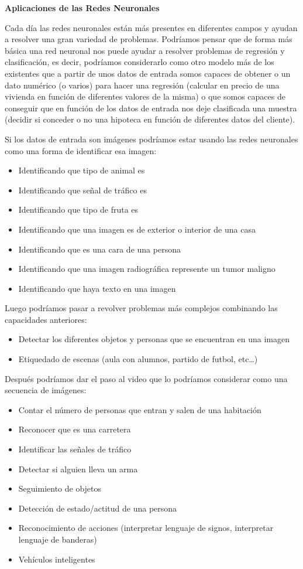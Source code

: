 \documentclass[
  a4paper,
  DIV=11,
  numbers=noendperiod]{scrreprt}
\begin{document}
\textbf{Aplicaciones de las Redes Neuronales}

Cada día las redes neuronales están más presentes en diferentes campos y
ayudan a resolver una gran variedad de problemas. Podríamos pensar que
de forma más básica una red neuronal nos puede ayudar a resolver
problemas de regresión y clasificación, es decir, podríamos considerarlo
como otro modelo más de los existentes que a partir de unos datos de
entrada somos capaces de obtener o un dato numérico (o varios) para
hacer una regresión (calcular en precio de una vivienda en función de
diferentes valores de la misma) o que somos capaces de conseguir que en
función de los datos de entrada nos deje clasificada una muestra
(decidir si conceder o no una hipoteca en función de diferentes datos
del cliente).

Si los datos de entrada son imágenes podríamos estar usando las redes
neuronales como una forma de identificar esa imagen:

\begin{itemize}
\item
  Identificando que tipo de animal es
\item
  Identificando que señal de tráfico es
\item
  Identificando que tipo de fruta es
\item
  Identificando que una imagen es de exterior o interior de una casa
\item
  Identificando que es una cara de una persona
\item
  Identificando que una imagen radiográfica represente un tumor maligno
\item
  Identificando que haya texto en una imagen
\end{itemize}

Luego podríamos pasar a revolver problemas más complejos combinando las
capacidades anteriores:

\begin{itemize}
\item
  Detectar los diferentes objetos y personas que se encuentran en una
  imagen
\item
  Etiquedado de escenas (aula con alumnos, partido de futbol, etc\ldots)
\end{itemize}

Después podríamos dar el paso al video que lo podríamos considerar como
una secuencia de imágenes:

\begin{itemize}
\item
  Contar el número de personas que entran y salen de una habitación
\item
  Reconocer que es una carretera
\item
  Identificar las señales de tráfico
\item
  Detectar si alguien lleva un arma
\item
  Seguimiento de objetos
\item
  Detección de estado/actitud de una persona
\item
  Reconocimiento de acciones (interpretar lenguaje de signos,
  interpretar lenguaje de banderas)
\item
  Vehículos inteligentes
\end{itemize}
\end{document}
